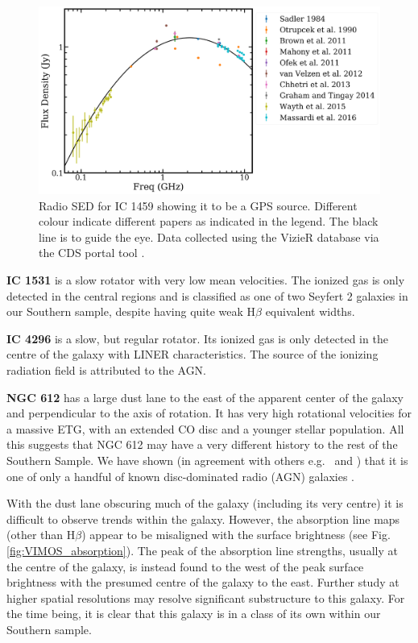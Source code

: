 \begin{figure}
	\centering
	\includegraphics[height=0.4\textwidth]{appendix/appendix2/ic1459.png}
	\caption[Radio SED for IC 1459]{Radio SED for IC 1459 showing it to be a GPS source. Different colour indicate different papers as indicated in the legend. The black line is to guide the eye. Data collected using the VizieR database via the CDS portal tool \citep{Ochsenbein2000}.} 
	\label{fig:ic1459radio}
\end{figure}
\nocite{Brown2011, Massardi2016, Ofek2011, Wayth2015, Mahony2011, Otrupcek1990, Graham2014, Chhetri2013, VanVelzen2012, Sadler1984}

\textbf{IC 1531} is a slow rotator with very low mean velocities. The ionized gas is only detected in the central regions and is classified as one of two Seyfert 2 galaxies in our Southern sample, despite having quite weak H$\beta$ equivalent widths. 

\textbf{IC 4296} is a slow, but regular rotator. Its ionized gas is only detected in the centre of the galaxy with LINER characteristics. The source of the ionizing radiation field is attributed to the AGN. 

\textbf{NGC 612} has a large dust lane to the east of the apparent center of the galaxy and perpendicular to the axis of rotation. It has very high rotational velocities for a massive ETG, with an extended CO disc and a younger stellar population. All this suggests that NGC 612 may have a very different history to the rest of the Southern Sample. We have shown (in agreement with others e.g.\ \citealt{Ledlow1998} and \citealt{Emonts2009}) that it is one of only a handful of known disc-dominated radio (AGN) galaxies \citep[e.g.][]{Morganti2011}. %

With the dust lane obscuring much of the galaxy (including its very centre) it is difficult to observe trends within the galaxy. However, the absorption line maps (other than H$\beta$) appear to be misaligned with the surface brightness (see Fig.\,\ref{fig:VIMOS_absorption}). The peak of the absorption line strengths, usually at the centre of the galaxy, is instead found to the west of the peak surface brightness with the presumed centre of the galaxy to the east. Further study at higher spatial resolutions may resolve significant substructure to this galaxy. For the time being, it is clear that this galaxy is in a class of its own within our Southern sample. 

